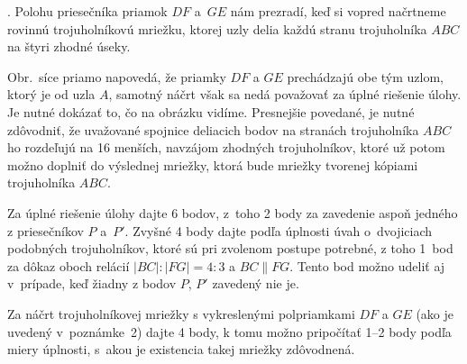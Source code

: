 {.
Polohu priesečníka priamok $DF$ a~$GE$ nám prezradí, keď si
vopred načrtneme rovinnú trojuholníkovú mriežku, ktorej uzly delia
každú stranu trojuholníka $ABC$ na štyri zhodné úseky.
%

Obr.\,\obrnum{} síce priamo napovedá, že priamky $DF$ a $GE$ prechádzajú
obe tým uzlom, ktorý je  od uzla $A$, samotný
náčrt však sa nedá považovať za úplné riešenie úlohy.
Je nutné dokázať to, čo na obrázku vidíme. Presnejšie povedané,
je nutné zdôvodniť, že uvažované spojnice deliacich bodov
na stranách trojuholníka $ABC$ ho rozdeľujú na 16 menších,
navzájom zhodných trojuholníkov, ktoré už potom
možno doplniť do výslednej mriežky, ktorá bude  mriežky tvorenej
kópiami trojuholníka $ABC$.

\schemaABC
Za úplné riešenie úlohy dajte 6 bodov, z~toho 2 body za
zavedenie aspoň jedného z priesečníkov $P$ a~$P'$.
Zvyšné 4 body dajte podľa úplnosti úvah o~dvojiciach podobných
trojuholníkov, ktoré sú pri zvolenom postupe potrebné,
z toho 1~bod za dôkaz oboch relácií $|BC|:|FG|=4:3$ a $BC\parallel
FG$. Tento bod možno udeliť aj v~prípade, keď žiadny z bodov $P$, $P'$
zavedený nie je.

Za náčrt trojuholníkovej mriežky s vykreslenými polpriamkami $DF$ a $GE$
(ako je uvedený v~poznámke~2) dajte 4 body,
k tomu možno pripočítať 1--2 body podľa miery úplnosti,
s~akou je existencia takej mriežky zdôvodnená.
\endschema
}

